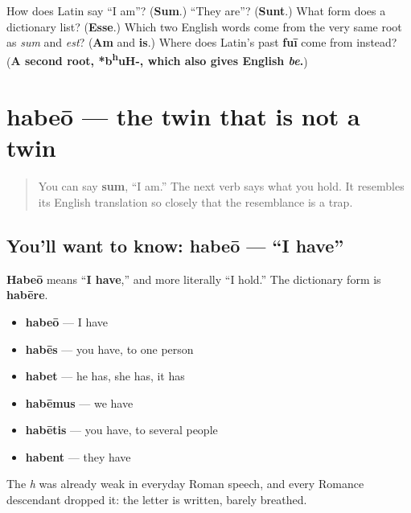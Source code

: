 \begin{tcolorbox}[breakable,colback=teal!4,colframe=teal!35!black,title={Before you move on}]
How does Latin say \textquotedblleft{}I am\textquotedblright{}? (\textbf{Sum}.) \textquotedblleft{}They are\textquotedblright{}? (\textbf{Sunt}.) What form does a dictionary list? (\textbf{Esse}.) Which two English words come from the very same root as \emph{sum} and \emph{est}? (\textbf{Am} and \textbf{is}.) Where does Latin's past \textbf{fuī} come from instead? (\textbf{A second root, *b\textsuperscript{h}uH-, which also gives English \emph{be}.})
\end{tcolorbox}
\section[habeō, habēre]{habeō — the twin that is not a twin}

\label{lesson:LA-C37-habeo}



\begin{quote}
You can say \textbf{sum}, \textquotedblleft{}I am.\textquotedblright{} The next verb says what you hold. It resembles its English translation so closely that the resemblance is a trap.
\end{quote}

\subsection*{You'll want to know: habeō — \textquotedblleft{}I have\textquotedblright{}}
\textbf{Habeō} means \textquotedblleft{}\textbf{I have},\textquotedblright{} and more literally \textquotedblleft{}I hold.\textquotedblright{} The dictionary form is \textbf{habēre}.

\begin{itemize}
\raggedright
  \item \textbf{habeō} — I have
  \item \textbf{habēs} — you have, to one person
  \item \textbf{habet} — he has, she has, it has
  \item \textbf{habēmus} — we have
  \item \textbf{habētis} — you have, to several people
  \item \textbf{habent} — they have
\end{itemize}

The \emph{h} was already weak in everyday Roman speech, and every Romance descendant dropped it: the letter is written, barely breathed.

